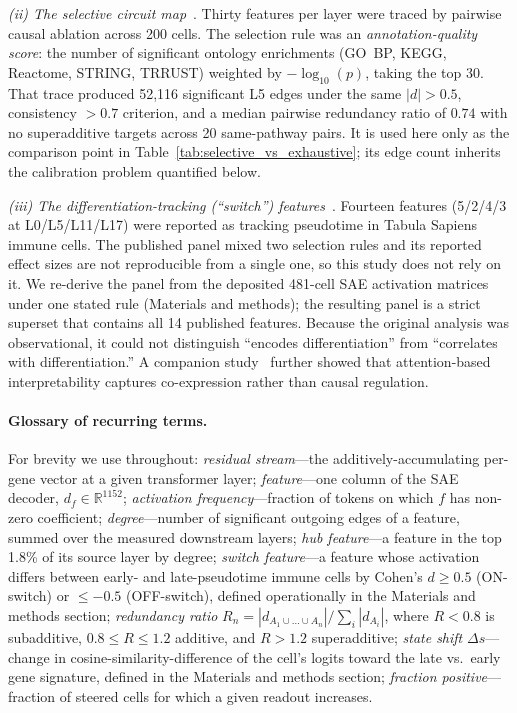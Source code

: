 \documentclass[11pt,onecolumn]{article}
\begin{document}
\emph{(ii) The selective circuit map}~\citep{kendiukhov2025circuits}. Thirty features per layer were traced by pairwise causal ablation across 200 cells. The selection rule was an \emph{annotation-quality score}: the number of significant ontology enrichments (GO~BP, KEGG, Reactome, STRING, TRRUST) weighted by $-\log_{10}(p)$, taking the top 30. That trace produced 52{,}116 significant L5 edges under the same $|d|>0.5$, consistency $>0.7$ criterion, and a median pairwise redundancy ratio of $0.74$ with no superadditive targets across 20 same-pathway pairs. It is used here only as the comparison point in Table~\ref{tab:selective_vs_exhaustive}; its edge count inherits the calibration problem quantified below.

\emph{(iii) The differentiation-tracking (``switch'') features}~\citep{kendiukhov2025circuits}. Fourteen features (5/2/4/3 at L0/L5/L11/L17) were reported as tracking pseudotime in Tabula Sapiens immune cells. The published panel mixed two selection rules and its reported effect sizes are not reproducible from a single one, so this study does not rely on it. We re-derive the panel from the deposited 481-cell SAE activation matrices under one stated rule (Materials and methods); the resulting panel is a strict superset that contains all 14 published features. Because the original analysis was observational, it could not distinguish ``encodes differentiation'' from ``correlates with differentiation.'' A companion study~\citep{kendiukhov2025systematic} further showed that attention-based interpretability captures co-expression rather than causal regulation.

\paragraph{Glossary of recurring terms.}
For brevity we use throughout:
\emph{residual stream}---the additively-accumulating per-gene vector at a given transformer layer;
\emph{feature}---one column of the SAE decoder, $d_f \in \mathbb{R}^{1152}$;
\emph{activation frequency}---fraction of tokens on which $f$ has non-zero coefficient;
\emph{degree}---number of significant outgoing edges of a feature, summed over the measured downstream layers;
\emph{hub feature}---a feature in the top 1.8\% of its source layer by degree;
\emph{switch feature}---a feature whose activation differs between early- and late-pseudotime immune cells by Cohen's $d\geq 0.5$ (ON-switch) or $\leq -0.5$ (OFF-switch), defined operationally in the Materials and methods section;
\emph{redundancy ratio} $R_n = |d_{A_1\cup\dots\cup A_n}| / \sum_i |d_{A_i}|$, where $R<0.8$ is subadditive, $0.8\leq R\leq 1.2$ additive, and $R>1.2$ superadditive;
\emph{state shift} $\Delta s$---change in cosine-similarity-difference of the cell's logits toward the late vs.\ early gene signature, defined in the Materials and methods section;
\emph{fraction positive}---fraction of steered cells for which a given readout increases.
\end{document}
